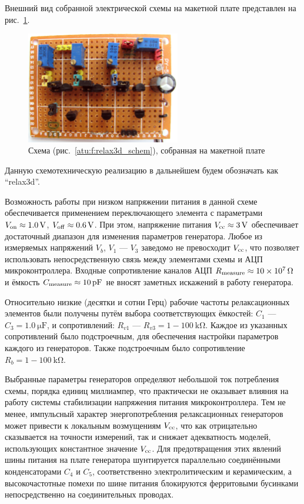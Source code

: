 Внешний вид собранной электрической схемы на макетной плате представлен на рис.~\ref{atu:f:relax3d_board}.

\begin{figure}[htb!]
  \centerline{\includegraphics[width=0.6\textwidth]{p/relax3d_board.jpg} }
  \caption{Схема (рис.~\ref{atu:f:relax3d_schem}), собранная на макетной плате}
  \label{atu:f:relax3d_board}
\end{figure}

Данную схемотехническую реализацию в дальнейшем будем обозначать как ``relax3d''.

Возможность работы при низком напряжении питания в данной схеме обеспечивается
применением переключающего элемента с параметрами
$V_\mathrm{on} \approx \SI{1.0}{\volt}$,
$V_\mathrm{off} \approx \SI{0.6}{\volt}$.
При этом, напряжение питания $V_\mathrm{cc} \approx \SI{3}{\volt}$
обеспечивает достаточный диапазон для изменения параметров генератора.
Любое из измеряемых напряжений $V_b$, $V_1$ --- $V_3$
заведомо не превосходит $V_\mathrm{cc}$,
что позволяет использовать непосредственную связь
между элементами схемы и АЦП микроконтроллера.
Входные сопротивление каналов АЦП $R_\mathrm{measure} \approx \SI{10e7}{\ohm}$
и ёмкость $C\Tidx{measure} \approx \SI{10}{\pico\farad} $
не вносят заметных искажений в работу генератора.

Относительно низкие (десятки и сотни Герц) рабочие частоты
релаксационных элементов были получены путём выбора соответствующих
ёмкостей:
$C_1$ --- $C_3 = \SI{1.0}{\micro\farad}$,
и сопротивлений:
$R_{v1}$ --- $R_{v3} = 1-\SI{100}{\kilo\ohm}$.
Каждое из указанных сопротивлений было подстроечным, для обеспечения
настройки параметров каждого из генераторов. Также подстроечным было сопротивление
$ R_{b} = 1-\SI{100}{\kilo\ohm}$.

Выбранные параметры генераторов определяют небольшой ток
потребления схемы, порядка единиц миллиампер, что
практически не оказывает влияния на работу
системы стабилизации напряжения питания микроконтроллера.
Тем не менее, импульсный характер энергопотребления
релаксационных генераторов может привести
к локальным возмущениям $V_\mathrm{cc}$, что
как отрицательно сказывается на точности измерений,
так и снижает адекватность моделей, использующих
константное значение $V_\mathrm{cc}$.
Для предотвращения этих явлений шины питания на плате генератора
шунтируется параллельно соединёнными конденсаторами $C_4$ и $C_5$,
соответственно электролитическим и керамическим,
а высокочастотные помехи по шине питания блокируются
ферритовыми бусинками непосредственно на соединительных проводах.

